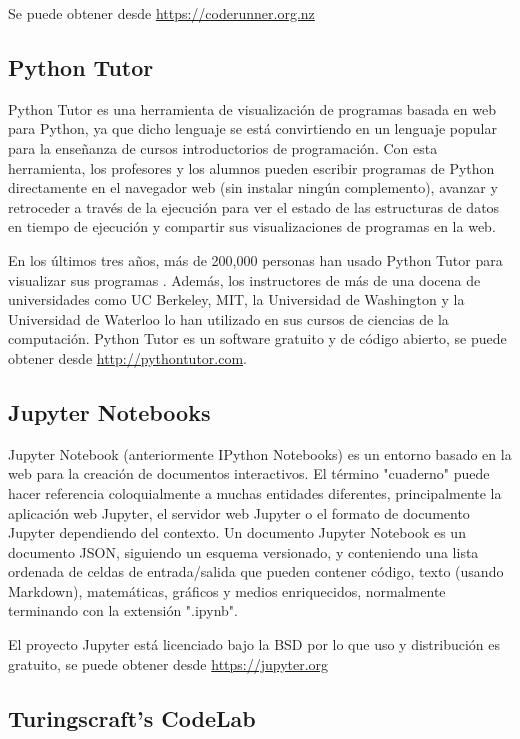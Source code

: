 Se puede obtener desde \url{https://coderunner.org.nz}

\subsection {Python Tutor}

Python Tutor es una herramienta de visualización de programas basada en web para Python, ya que dicho lenguaje se está convirtiendo en un lenguaje popular para la enseñanza de cursos introductorios de programación. Con esta herramienta, los profesores y los alumnos pueden escribir programas de Python directamente en el navegador web (sin instalar ningún complemento), avanzar y retroceder a través de la ejecución para ver el estado de las estructuras de datos en tiempo de ejecución y compartir sus visualizaciones de programas en la web.

En los últimos tres años, más de 200,000 personas han usado Python Tutor para visualizar sus programas \cite{GuoSIGCSE2013}. Además, los instructores de más de una docena de universidades como UC Berkeley, MIT, la Universidad de Washington y la Universidad de Waterloo lo han utilizado en sus cursos de ciencias de la computación. Python Tutor es un software gratuito y de código abierto, se puede obtener desde \url{http://pythontutor.com}.


\subsection {Jupyter Notebooks}

Jupyter Notebook (anteriormente IPython Notebooks) es un entorno basado en la web para la creación de documentos interactivos. El término "cuaderno" puede hacer referencia coloquialmente a muchas entidades diferentes, principalmente la aplicación web Jupyter, el servidor web Jupyter o el formato de documento Jupyter dependiendo del contexto. Un documento Jupyter Notebook es un documento JSON, siguiendo un esquema versionado, y conteniendo una lista ordenada de celdas de entrada/salida que pueden contener código, texto (usando Markdown), matemáticas, gráficos y medios enriquecidos, normalmente terminando con la extensión ".ipynb".

El proyecto Jupyter está licenciado bajo la BSD por lo que uso y distribución es gratuito, se puede obtener desde \url{https://jupyter.org}

\subsection {Turingscraft's CodeLab}

